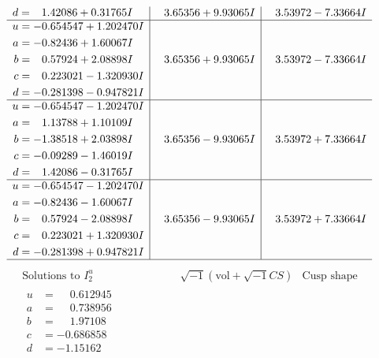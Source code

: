 \documentclass[1p]{elsarticle_modified}
\theoremstyle{definition}
\newcommand{\I}{\sqrt{-1}}
\begin{document}
$$\begin{array}{c|c|c}
\begin{aligned}
d &= \phantom{-}1.42086 + 0.31765 I\end{aligned}
 & \phantom{-}3.65356 + 9.93065 I & \phantom{-}3.53972 - 7.33664 I \\ \hline\begin{aligned}
u &= -0.654547 + 1.202470 I \\
a &= -0.82436 + 1.60067 I \\
b &= \phantom{-}0.57924 + 2.08898 I \\
c &= \phantom{-}0.223021 - 1.320930 I \\
d &= -0.281398 - 0.947821 I\end{aligned}
 & \phantom{-}3.65356 + 9.93065 I & \phantom{-}3.53972 - 7.33664 I \\ \hline\begin{aligned}
u &= -0.654547 - 1.202470 I \\
a &= \phantom{-}1.13788 + 1.10109 I \\
b &= -1.38518 + 2.03898 I \\
c &= -0.09289 - 1.46019 I \\
d &= \phantom{-}1.42086 - 0.31765 I\end{aligned}
 & \phantom{-}3.65356 - 9.93065 I & \phantom{-}3.53972 + 7.33664 I \\ \hline\begin{aligned}
u &= -0.654547 - 1.202470 I \\
a &= -0.82436 - 1.60067 I \\
b &= \phantom{-}0.57924 - 2.08898 I \\
c &= \phantom{-}0.223021 + 1.320930 I \\
d &= -0.281398 + 0.947821 I\end{aligned}
 & \phantom{-}3.65356 - 9.93065 I & \phantom{-}3.53972 + 7.33664 I\\
 \hline 
 \end{array}$$\newpage$$\begin{array}{c|c|c}  
\text{Solutions to }I^u_{2}& \I (\text{vol} + \sqrt{-1}CS) & \text{Cusp shape}\\
 \hline 
\begin{aligned}
u &= \phantom{-}0.612945\phantom{ +0.000000I} \\
a &= \phantom{-}0.738956\phantom{ +0.000000I} \\
b &= \phantom{-}1.97108\phantom{ +0.000000I} \\
c &= -0.686858\phantom{ +0.000000I} \\
d &= -1.15162\phantom{ +0.000000I}\end{aligned}

\end{array}$$
\end{document}
